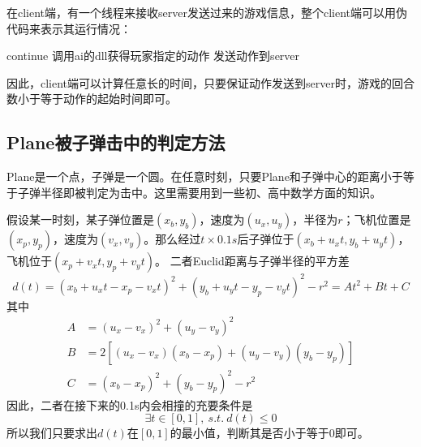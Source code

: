\documentclass[11pt,a4paper]{article}
\begin{document}
在client端，有一个线程来接收server发送过来的游戏信息，整个client端可以用伪代码来表示其运行情况：
\begin{algorithmic}
		\STATE continue
	\ELSE
		\STATE 调用ai的dll获得玩家指定的动作
		\STATE 发送动作到server
	\ENDIF
\ENDWHILE
\end{algorithmic}

因此，client端可以计算任意长的时间，只要保证动作发送到server时，游戏的回合数小于等于动作的起始时间即可。

\subsection{Plane被子弹击中的判定方法}
Plane是一个点，子弹是一个圆。在任意时刻，只要Plane和子弹中心的距离小于等于子弹半径即被判定为击中。这里需要用到一些初、高中数学方面的知识。

假设某一时刻，某子弹位置是$(x_b,y_b)$，速度为$(u_x,u_y)$，半径为$r$；飞机位置是$(x_p,y_p)$，速度为$(v_x,v_y)$。那么经过$t\times 0.1s$后子弹位于$(x_b+u_xt,y_b+u_yt)$，飞机位于$(x_p+v_xt,y_p+v_yt)$。
二者Euclid距离与子弹半径的平方差$$d(t)=(x_b+u_xt-x_p-v_xt)^2+(y_b+u_yt-y_p-v_yt)^2-r^2=At^2+Bt+C$$
其中
\begin{align*}
A&=(u_x-v_x)^2+(u_y-v_y)^2\\
B&=2\left[(u_x-v_x)(x_b-x_p)+(u_y-v_y)(y_b-y_p)\right]\\
C&=(x_b-x_p)^2+(y_b-y_p)^2-r^2
\end{align*}
因此，二者在接下来的0.1s内会相撞的充要条件是$$\exists t \in [0,1],~s.t.~d(t) \leq 0$$
所以我们只要求出$d(t)$在$[0,1]$的最小值，判断其是否小于等于0即可。
\end{document}
